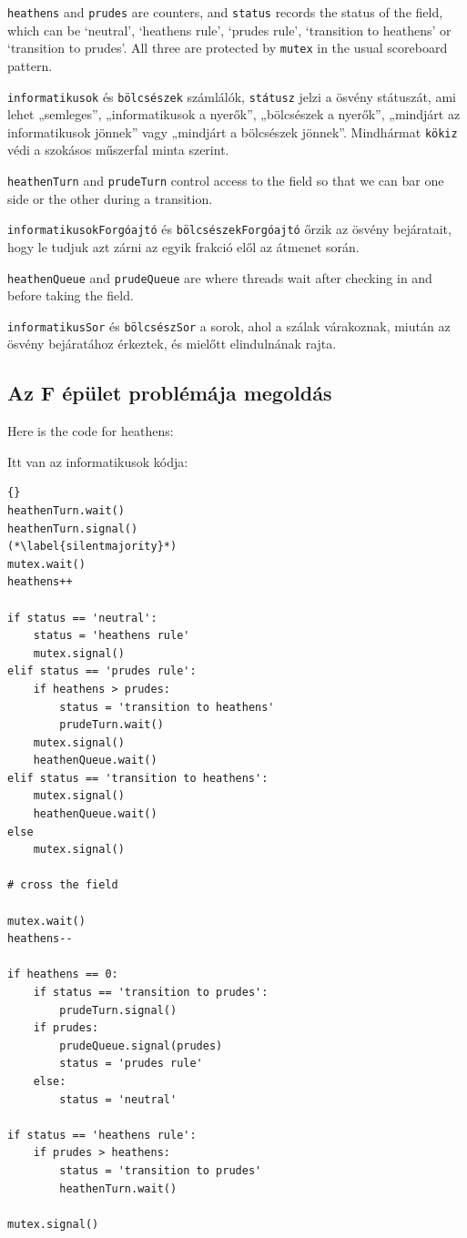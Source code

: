 \documentclass{book}
\newcommand{\clearemptydoublepage}{\newpage\cleardoublepage}
\begin{document}
{\tt heathens} and {\tt prudes} are counters, and {\tt status} records
the status of the field, which can be `neutral', `heathens rule',
`prudes rule', `transition to heathens' or `transition to prudes'.
All three are protected by {\tt mutex} in the usual scoreboard
pattern.

{\tt informatikusok} és {\tt bölcsészek} számlálók, {\tt státusz} jelzi
a ösvény státuszát, ami lehet „semleges”, „informatikusok a nyerők”,
„bölcsészek a nyerők”, „mindjárt az informatikusok jönnek” vagy
„mindjárt a bölcsészek jönnek”.
Mindhármat {\tt kökiz} védi a szokásos műszerfal minta szerint.

{\tt heathenTurn} and {\tt prudeTurn} control access to the field
so that we can bar one side or the other during a transition.

{\tt informatikusokForgóajtó} és {\tt bölcsészekForgóajtó} őrzik
az ösvény bejáratait, hogy le tudjuk azt zárni az egyik frakció
elől az átmenet során.

{\tt heathenQueue} and {\tt prudeQueue} are where threads wait after
checking in and before taking the field.

{\tt informatikusSor} és {\tt bölcsészSor} a sorok, ahol a szálak várakoznak,
miután az ösvény bejáratához érkeztek, és mielőtt elindulnának rajta.

\clearemptydoublepage
\subsection{Az F épület problémája megoldás}

Here is the code for heathens:

Itt van az informatikusok kódja:

\begin{lstlisting}[title={Modus problem solution}]{}
heathenTurn.wait()
heathenTurn.signal()
(*\label{silentmajority}*)
mutex.wait()
heathens++

if status == 'neutral':
    status = 'heathens rule'
    mutex.signal()
elif status == 'prudes rule':
    if heathens > prudes:
        status = 'transition to heathens'
        prudeTurn.wait()
    mutex.signal()
    heathenQueue.wait()
elif status == 'transition to heathens':
    mutex.signal()
    heathenQueue.wait()
else
    mutex.signal()

# cross the field

mutex.wait()
heathens--

if heathens == 0:
    if status == 'transition to prudes':
        prudeTurn.signal()
    if prudes:
        prudeQueue.signal(prudes)
        status = 'prudes rule'
    else:
        status = 'neutral'
        
if status == 'heathens rule':
    if prudes > heathens:
        status = 'transition to prudes'
        heathenTurn.wait()

mutex.signal()
\end{lstlisting}
\end{document}
